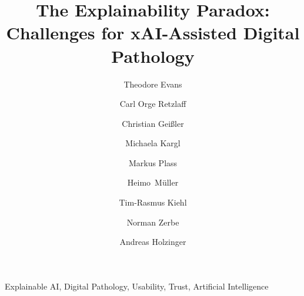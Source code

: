 \documentclass[final,5p,times,twocolumn,hyphens]{elsarticle}
\def\corref#1{}%
\begin{document}
\begin{frontmatter}

\title{The Explainability Paradox: Challenges for xAI-Assisted Digital Pathology}

\author[TUB]{Theodore Evans\corref{mycorrespondingauthor}}
\author[TUB]{Carl Orge Retzlaff}
\author[TUB]{Christian Geißler}
\author[MUG]{Michaela Kargl}
\author[MUG]{Markus Plass}
\author[MUG]{Heimo~M{\"u}ller}
\author[CAR]{Tim-Rasmus Kiehl}
\author[CAR]{Norman Zerbe}
\author[MUG]{Andreas Holzinger }

\address[TUB]{DAI-Labor, Technical University Berlin, Germany}
\address[MUG]{Medical University Graz, Austria}
\address[CAR]{Charité – Universit{\"a}tsmedizin Berlin, corporate member of Freie Universit{\"a}t Berlin and Humboldt- Universit{\"a}t zu Berlin, Institute of Pathology, Germany}

\begin{abstract} 
\end{abstract}

\begin{keyword}
Explainable AI, Digital Pathology, Usability, Trust, Artificial Intelligence
\end{keyword}

\end{frontmatter}
\linenumbers

 

 

 




\end{document}
